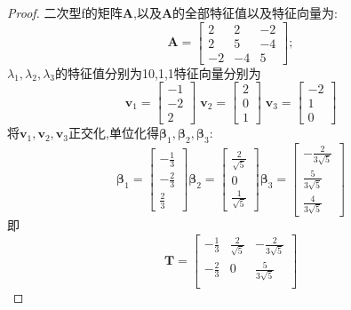 \documentclass[lang=cn,11pt,normal]{elegantbook}
\renewcommand{\AA}{\boldsymbol{A}}
\newcommand{\TT}{\boldsymbol{T}}
\begin{document}
	\begin{proof}
		二次型f的矩阵$\AA$,以及$\AA$的全部特征值以及特征向量为:
		\begin{equation}
		\AA=
		\begin{bmatrix}
		2&2&-2\\
		2&5&-4\\
		-2&-4&5
		\end{bmatrix};
		\end{equation}
		$\lambda_1,\lambda_2,\lambda_3$的特征值分别为10,1,1特征向量分别为
		\begin{equation}
		\boldsymbol{v}_1=\begin{bmatrix}-1\\-2\\2\end{bmatrix}\;\boldsymbol{v}_2=\begin{bmatrix}2\\0\\1\end{bmatrix}\;\boldsymbol{v}_3=\begin{bmatrix}-2\\1\\0\end{bmatrix}
		\end{equation}
		将$\boldsymbol{v}_1,\boldsymbol{v}_2,\boldsymbol{v}_3$正交化,单位化得$\boldsymbol{\beta}_1,\boldsymbol{\beta}_2,\boldsymbol{\beta}_3$:
		\begin{equation}
		\boldsymbol{\beta}_1=
		\begin{bmatrix}
		-\frac{1}{3}\\-\frac{2}{3}\\\frac{2}{3}
		\end{bmatrix}
		\boldsymbol{\beta}_2=
		\begin{bmatrix}
		\frac{2}{\sqrt{5}}\\0\\\frac{1}{\sqrt{5}}
		\end{bmatrix}
		\boldsymbol{\beta}_3=
		\begin{bmatrix}
		-\frac{2}{3\sqrt{5}}\\\frac{5}{3\sqrt{5}}\\\frac{4}{3\sqrt{5}}
		\end{bmatrix}
		\end{equation}
		即
		\begin{equation}
		\TT=
		\begin{bmatrix}
		-\frac{1}{3}&\frac{2}{\sqrt{5}}&-\frac{2}{3\sqrt{5}}\\
		-\frac{2}{3}&0&\frac{5}{3\sqrt{5}}\\

\end{bmatrix}
\end{equation}
\end{proof}
\end{document}
